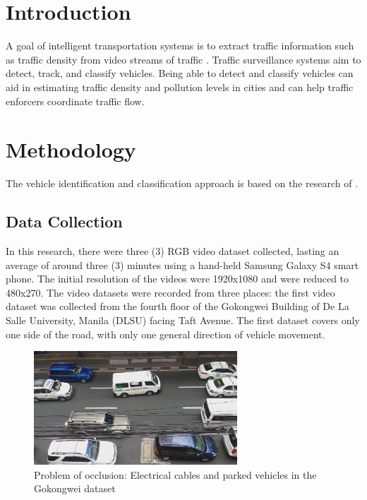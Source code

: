 \documentclass[conference]{IEEEtran}
\begin{document}
%
\IEEEpeerreviewmaketitle

\section{Introduction}
A goal of intelligent transportation systems is to extract traffic information such as traffic density from video streams of traffic \cite{Jun-Wei}. Traffic surveillance systems aim to detect, track, and classify vehicles. Being able to detect and classify vehicles can aid in estimating traffic density and pollution levels in cities and can help traffic enforcers coordinate traffic flow.

\section{Methodology}
The vehicle identification and classification approach is based on the research of \cite{Jun-Wei}.

\subsection{Data Collection}

In this research, there were three (3) RGB video dataset collected, lasting an average of around three (3) minutes using a hand-held Samsung Galaxy S4 smart phone. The initial resolution of the videos were 1920x1080 and were reduced to 480x270. The video datasets were recorded from three places: the first video dataset was collected from the fourth floor of the Gokongwei Building of De La Salle University, Manila (DLSU) facing Taft Avenue. The first dataset covers only one side of the road, with only one general direction of vehicle movement.

\begin{figure}[!h]
\centering
\includegraphics[width=3in]{dataset1_sample.png}
\caption{Problem of occlusion: Electrical cables and parked vehicles in the Gokongwei dataset}
\label{fig_electrical_cables}
\end{figure}
\end{document}
